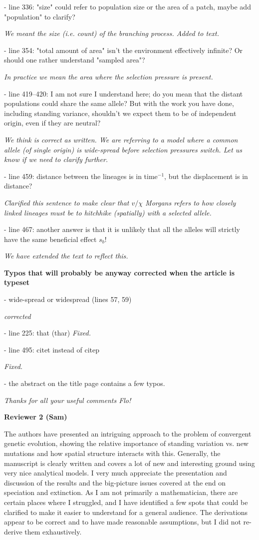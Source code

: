 \documentclass[12pt,letterpaper]{article}
\newcommand{\response}[1]{\emph{ \color{blue} #1}}
\begin{document}
- line 336: "size" could refer to population size or the area of a patch, maybe add "population" to clarify?

\response{We meant the size (i.e. count) of the branching process. Added to text.} 


- line 354: "total amount of area" isn't the environment effectively infinite? Or should one rather understand "sampled area"?

\response{In practice we mean the area where the selection pressure is present.}

- line 419--420: I am not sure I understand here; do you mean that the distant populations could share the same allele? But with the work you have done, including standing variance, shouldn't we expect them to be of independent origin, even if they are neutral?

\response{We think is correct as written. We are referring to a model where a common allele (of single origin) is wide-spread before selection pressures switch. Let us know if we need to clarify further.}

- line 459: distance between the lineages is in time$^{-1}$, but the displacement is in distance?


\response{Clarified this sentence to make clear that $ v/\chi$ Morgans refers to how closely linked lineages must be to hitchhike (spatially) with a selected allele. }

- line 467: another answer is that it is unlikely that all the alleles will strictly have the same beneficial effect $s_b$!

\response{We have extended the text to reflect this.}

\textbf{Typos that will probably be anyway corrected when the article is typeset}

- wide-spread or widespread (lines 57, 59) 

\response{corrected}

- line 225: that (thar)
\response{Fixed.}

- line 495: citet instead of citep

\response{Fixed.}

- the abstract on the title page contains a few typos.

\response{Thanks for all your useful comments Flo!}


\newpage 
{\bf Reviewer 2 (Sam)}

The authors have presented an intriguing approach to the problem of convergent genetic evolution, showing the relative importance of standing variation vs. new mutations and how spatial structure interacts with this. Generally, the manuscript is clearly written and covers a lot of new and interesting ground using very nice analytical models. I very much appreciate the presentation and discussion of the results and the big-picture issues covered at the end on speciation and extinction. As I am not primarily a mathematician, there are certain places where I struggled, and I have identified a few spots that could be clarified to make it easier to understand for a general audience. The derivations appear to be correct and to have made reasonable assumptions, but I did not re-derive them exhaustively.
\end{document}
